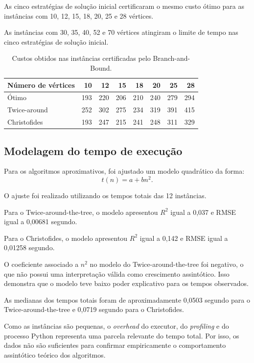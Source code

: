 \documentclass[12pt]{article}
\begin{document}
As cinco estratégias de solução inicial certificaram o mesmo custo ótimo para as instâncias com 10, 12, 15, 18, 20, 25 e 28 vértices.

As instâncias com 30, 35, 40, 52 e 70 vértices atingiram o limite de tempo nas cinco estratégias de solução inicial.

\begin{table}[ht]
\centering
\caption{Custos obtidos nas instâncias certificadas pelo Branch-and-Bound.}
\label{tab:costs}
\begin{tabular}{lrrrrrrr}
\toprule
Número de vértices & 10 & 12 & 15 & 18 & 20 & 25 & 28 \\
\midrule
Ótimo & 193 & 220 & 206 & 210 & 240 & 279 & 294 \\
Twice-around & 252 & 302 & 275 & 234 & 319 & 391 & 415 \\
Christofides & 193 & 247 & 215 & 241 & 248 & 311 & 329 \\
\bottomrule
\end{tabular}
\end{table}

\subsection{Modelagem do tempo de execução}

Para os algoritmos aproximativos, foi ajustado um modelo quadrático da forma:
\begin{equation}
 t(n) = a + bn^2.
\end{equation}

O ajuste foi realizado utilizando os tempos totais das 12 instâncias.

Para o Twice-around-the-tree, o modelo apresentou $R^2$ igual a 0,037 e RMSE igual a 0,00681 segundo.

Para o Christofides, o modelo apresentou $R^2$ igual a 0,142 e RMSE igual a 0,01258 segundo.

O coeficiente associado a $n^2$ no modelo do Twice-around-the-tree foi negativo, o que não possui uma interpretação válida como crescimento assintótico. Isso demonstra que o modelo teve baixo poder explicativo para os tempos observados.

As medianas dos tempos totais foram de aproximadamente 0,0503 segundo para o Twice-around-the-tree e 0,0719 segundo para o Christofides.

Como as instâncias são pequenas, o \emph{overhead} do executor, do \emph{profiling} e do processo Python representa uma parcela relevante do tempo total. Por isso, os dados não são suficientes para confirmar empiricamente o comportamento assintótico teórico dos algoritmos.
\end{document}
